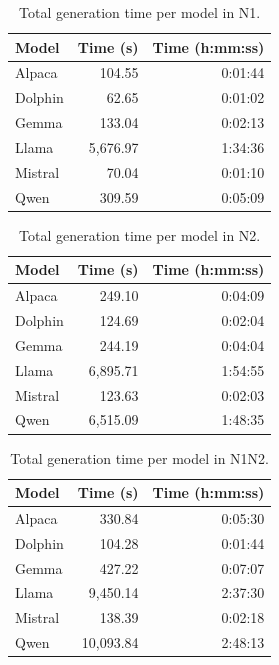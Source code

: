 \documentclass[a4paper,fleqn]{cas-sc}
\newcommand{\melhor}[1]{\textcolor{green!55!black}{#1}}
\newcommand{\pior}[1]{\textcolor{red!80!black}{#1}}
\begin{document}
\begin{table}[ht]
\centering
\caption{Total generation time per model in N1.}
\label{tab:tempo_n1}
\begin{tabular}{lrr}
\hline
Model & Time (s) & Time (h:mm:ss) \\
\hline
Alpaca  & 104.55 & 0:01:44 \\
Dolphin & \melhor{62.65} & \melhor{0:01:02} \\
Gemma   & 133.04 & 0:02:13 \\
Llama   & \pior{5,676.97} & \pior{1:34:36} \\
Mistral & 70.04 & 0:01:10 \\
Qwen    & 309.59 & 0:05:09 \\
\hline
\end{tabular}
\end{table}

\begin{table}[ht]
\centering
\caption{Total generation time per model in N2.}
\label{tab:tempo_n2}
\begin{tabular}{lrr}
\hline
Model & Time (s) & Time (h:mm:ss) \\
\hline
Alpaca  & 249.10 & 0:04:09 \\
Dolphin & 124.69 & 0:02:04 \\
Gemma   & 244.19 & 0:04:04 \\
Llama   & \pior{6,895.71} & \pior{1:54:55} \\
Mistral & \melhor{123.63} & \melhor{0:02:03} \\
Qwen    & 6,515.09 & 1:48:35 \\
\hline
\end{tabular}
\end{table}

\begin{table}[ht]
\centering
\caption{Total generation time per model in N1N2.}
\label{tab:tempo_n1n2}
\begin{tabular}{lrr}
\hline
Model & Time (s) & Time (h:mm:ss) \\
\hline
Alpaca  & 330.84 & 0:05:30 \\
Dolphin & \melhor{104.28} & \melhor{0:01:44} \\
Gemma   & 427.22 & 0:07:07 \\
Llama   & 9,450.14 & 2:37:30 \\
Mistral & 138.39 & 0:02:18 \\
Qwen    & \pior{10,093.84} & \pior{2:48:13} \\
\hline
\end{tabular}
\end{table}
\end{document}
